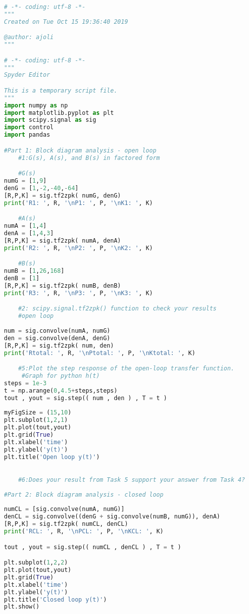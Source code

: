 \documentclass[12pt]{report}
\begin{document}
\begin{lstlisting}[language=Python, caption= Lab 7 code]
# -*- coding: utf-8 -*-
"""
Created on Tue Oct 15 19:36:40 2019

@author: ajoli
"""

# -*- coding: utf-8 -*-
"""
Spyder Editor

This is a temporary script file.
"""
import numpy as np
import matplotlib.pyplot as plt
import scipy.signal as sig
import control
import pandas

#Part 1: Block diagram analysis - open loop
    #1:G(s), A(s), and B(s) in factored form

    #G(s)
numG = [1,9]
denG = [1,-2,-40,-64]
[R,P,K] = sig.tf2zpk( numG, denG)
print('R1: ', R, '\nP1: ', P, '\nK1: ', K)

    #A(s)
numA = [1,4]
denA = [1,4,3]
[R,P,K] = sig.tf2zpk( numA, denA)
print('R2: ', R, '\nP2: ', P, '\nK2: ', K)

    #B(s)
numB = [1,26,168]
denB = [1]
[R,P,K] = sig.tf2zpk( numB, denB)
print('R3: ', R, '\nP3: ', P, '\nK3: ', K)

    #2: scipy.signal.tf2zpk() function to check your results
    #open loop
    
num = sig.convolve(numA, numG)
den = sig.convolve(denA, denG)
[R,P,K] = sig.tf2zpk( num, den)
print('Rtotal: ', R, '\nPtotal: ', P, '\nKtotal: ', K)

    #5:Plot the step response of the open-loop transfer function.
     #Graph for python h(t) 
steps = 1e-3
t = np.arange(0,4.5+steps,steps)   
tout , yout = sig.step(( num , den ) , T = t )
 
myFigSize = (15,10)
plt.subplot(1,2,1)
plt.plot(tout,yout)
plt.grid(True)
plt.xlabel('time')
plt.ylabel('y(t)')
plt.title('Open loop y(t)')
 

    #6:Does your result from Task 5 support your answer from Task 4?
    
#Part 2: Block diagram analysis - closed loop
    
numCL = [sig.convolve(numA, numG)]
denCL = sig.convolve((denG + sig.convolve(numB, numG)), denA)
[R,P,K] = sig.tf2zpk( numCL, denCL)
print('RCL: ', R, '\nPCL: ', P, '\nKCL: ', K)

tout , yout = sig.step(( numCL , denCL ) , T = t )

plt.subplot(1,2,2)
plt.plot(tout,yout)
plt.grid(True)
plt.xlabel('time')
plt.ylabel('y(t)')
plt.title('Closed loop y(t)')
plt.show()

\end{lstlisting}
\end{document}
